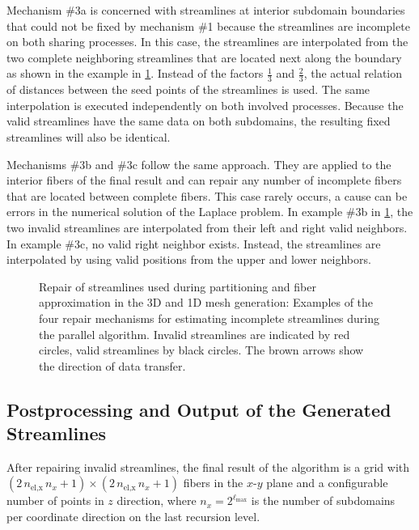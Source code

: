 Mechanism \#3a is concerned with streamlines at interior subdomain boundaries that could not be fixed by mechanism \#1 because the streamlines are incomplete on both sharing processes. In this case, the streamlines are interpolated from the two complete neighboring streamlines that are located next along the boundary as shown in the example in \cref{fig:fix_invalid}. Instead of the factors $\frac13$ and $\frac23$, the actual relation of distances between the seed points of the streamlines is used. The same interpolation is executed independently on both involved processes. Because the valid streamlines have the same data on both subdomains, the resulting fixed streamlines will also be identical.

Mechanisms \#3b and \#3c follow the same approach. They are applied to the interior fibers of the final result and can repair any number of incomplete fibers that are located between complete fibers. This case rarely occurs, a cause can be errors in the numerical solution of the Laplace problem.  In example \#3b in \cref{fig:fix_invalid}, the two invalid streamlines are interpolated from their left and right valid neighbors. In example \#3c, no valid right neighbor exists. Instead, the streamlines are interpolated by using valid positions from the upper and lower neighbors.

\begin{figure}%
  \centering%
  \def\svgwidth{0.8\textwidth}
  
  \caption{Repair of streamlines used during partitioning and fiber approximation in the 3D and 1D mesh generation: Examples of the four repair mechanisms for estimating incomplete streamlines during the parallel algorithm. Invalid streamlines are indicated by red circles, valid streamlines by black circles. The brown arrows show the direction of data transfer.}%
  \label{fig:fix_invalid}%
\end{figure}%

\subsection{Postprocessing and Output of the Generated Streamlines}\label{sec:postprocessing_of_the_generated_streamlines}

After repairing invalid streamlines, the final result of the algorithm is a grid with $(2\,n_\text{el,x}\,n_x+1) \times (2\,n_\text{el,x}\,n_x+1)$ fibers in the $x$-$y$ plane and a configurable number of points in $z$ direction, where $n_x = 2^{\ell_\text{max}}$ is the number of subdomains per coordinate direction on the last recursion level. 

